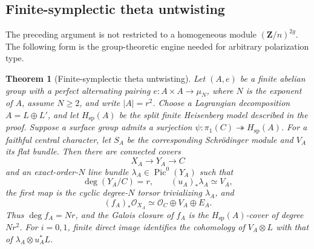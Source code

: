 \documentclass[11pt,reqno]{amsart}
\numberwithin{equation}{section}
\newtheorem{theorem}{Theorem}[section]
\theoremstyle{remark}
\DeclareMathOperator{\Pic}{Pic}
\newcommand{\cO}{\mathcal O}
\newcommand{\bZ}{\mathbf Z}
\begin{document}
\subsection{Finite-symplectic theta untwisting}

The preceding argument is not restricted to a homogeneous module
\((\bZ/n)^{2g}\).  The following form is the group-theoretic engine
needed for arbitrary polarization type.

\begin{theorem}[Finite-symplectic theta untwisting]
\label{thm:finite-symplectic-untwisting}
Let \((A,e)\) be a finite abelian group with a perfect alternating
pairing \(e\colon A\times A\to\mu_N\), where \(N\) is the exponent of
\(A\), assume \(N\geq2\), and write \(|A|=r^2\).  Choose a Lagrangian
decomposition \(A=L\oplus L'\), and let \(H_{\mathrm{sp}}(A)\) be the
split finite Heisenberg model described in the proof.  Suppose a surface group admits a
surjection
\(\psi\colon\pi_1(C)\twoheadrightarrow H_{\mathrm{sp}}(A)\).  For a faithful
central character, let \(S_A\) be the corresponding Schr\"odinger
module and \(V_A\) its flat bundle.  Then there are connected covers
\[
 X_A\longrightarrow Y_A\longrightarrow C
\]
and an exact-order-\(N\) line bundle \(\lambda_A\in\Pic^0(Y_A)\) such
that
\[
 \deg(Y_A/C)=r,\qquad
 (u_A)_*\lambda_A\simeq V_A,
\]
the first map is the cyclic degree-\(N\) torsor trivializing
\(\lambda_A\), and
\[
 (f_A)_*\cO_{X_A}\simeq\cO_C\oplus V_A\oplus E_A.
\]
Thus \(\deg f_A=Nr\), and the Galois closure of \(f_A\) is the
\(H_{\mathrm{sp}}(A)\)-cover of degree \(Nr^2\).  For \(i=0,1\), finite direct image
identifies the cohomology of \(V_A\otimes L\) with that of
\(\lambda_A\otimes u_A^*L\).
\end{theorem}
\end{document}
